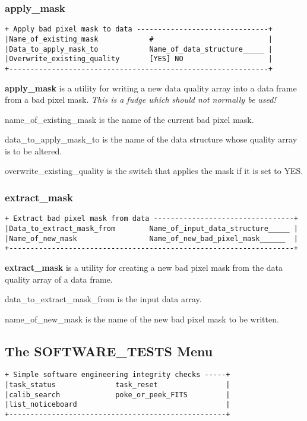 {\subsubsection{apply\_mask}
\begin{verbatim}
+ Apply bad pixel mask to data -------------------------------+
|Name_of_existing_mask            #                           |
|Data_to_apply_mask_to            Name_of_data_structure_____ |
|Overwrite_existing_quality       [YES] NO                    |
+-------------------------------------------------------------+
\end{verbatim}

{\bf apply\_mask} is a utility for writing a new data quality array
into a data frame from a bad pixel mask. {\em This is a fudge which should 
not normally be used!}

{\sf name\_of\_existing\_mask} is the name of the current bad pixel mask.

{\sf data\_to\_apply\_mask\_to} is the name of the data structure whose quality
array is to be altered.

{\sf overwrite\_existing\_quality} is the switch that applies the mask
if it is set to {\sf YES}.

\subsubsection{extract\_mask}
\begin{verbatim}
+ Extract bad pixel mask from data ---------------------------------+
|Data_to_extract_mask_from        Name_of_input_data_structure_____ |
|Name_of_new_mask                 Name_of_new_bad_pixel_mask______  |
+-------------------------------------------------------------------+
\end{verbatim}

{\bf extract\_mask} is a utility for creating a new bad pixel mask
from the data quality array of a data frame.

{\sf data\_to\_extract\_mask\_from} is the input data array.

{\sf name\_of\_new\_mask} is the name of the new bad pixel mask to be written.

\subsection{The SOFTWARE\_TESTS Menu}
\label{the_software_tests_menu}
\begin{verbatim}
+ Simple software engineering integrity checks -----+
|task_status              task_reset                |
|calib_search             poke_or_peek_FITS         |
|list_noticeboard                                   |
+---------------------------------------------------+
\end{verbatim}

}
